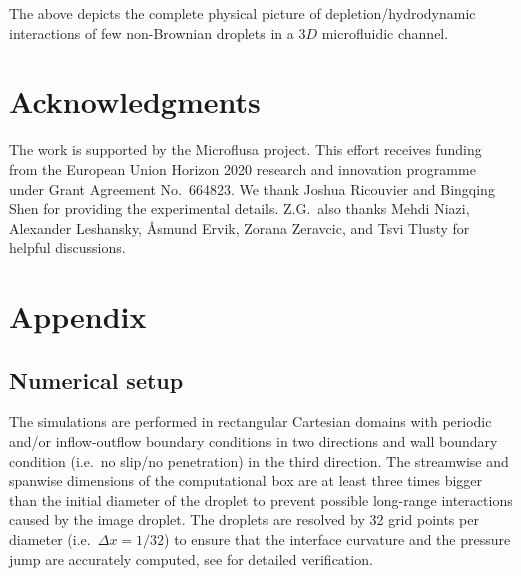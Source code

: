 The above depicts the complete physical picture of depletion/hydrodynamic interactions of few non-Brownian droplets in a $3D$ microfluidic channel. 

\section*{Acknowledgments}

The work is supported by the Microflusa project. This effort receives funding from the European Union Horizon 2020 research and innovation programme under Grant Agreement No.\ 664823.
We thank Joshua Ricouvier and Bingqing Shen for providing the experimental details. Z.G.\ also thanks Mehdi Niazi, Alexander Leshansky, \AA smund Ervik, Zorana Zeravcic, and Tsvi Tlusty for helpful discussions.


\section*{Appendix}
\renewcommand\thesubsection{\Alph{subsection}} %

\subsection{Numerical setup} \label{app:numerics}

The simulations are performed in rectangular Cartesian domains with periodic and/or inflow-outflow boundary conditions in two directions and wall boundary condition (i.e.\ no slip/no penetration) in the third direction. The streamwise and spanwise dimensions of the computational box are at least three times bigger than the initial diameter of the droplet to prevent possible long-range interactions caused by the image droplet. The droplets are resolved by 32 grid points per diameter (i.e.\ $\Delta x=1/32$) to ensure that the interface curvature and the pressure jump are accurately computed, see \cite{ICLS} for detailed verification.

